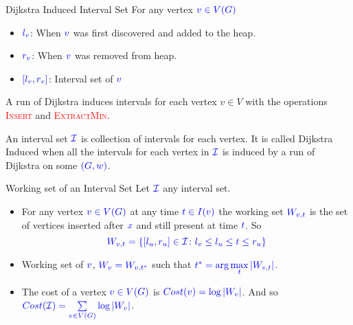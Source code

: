 \documentclass[10pt]{beamer}
\begin{document}
\begin{frame}{Dijkstra Induced Interval Set}
	For any vertex $\mathcolor{blue}{v\in V(G)}$\begin{itemize}
		\item $\mathcolor{blue}{l_v}$: When $\mathcolor{blue}{v}$ was first discovered and added to the heap.
		\item $\mathcolor{blue}{r_v}$: When $\mathcolor{blue}{v}$ was removed from heap.
		\item $\mathcolor{blue}{[l_v,r_v]}$: Interval set of $\mathcolor{blue}{v}$
	\end{itemize} \pause \vfill

	A run of Dijkstra induces intervals for each vertex $v\in V$ with the operations \textcolor{red}{\textsc{Insert}} and \textcolor{red}{\textsc{ExtractMin}}.\pause  \vfill

	An interval set $\mathcolor{blue}{\mathcal{I}}$ is collection of intervals for each vertex. It is called Dijkstra Induced when all the intervals for each vertex in $\mathcolor{blue}{\mathcal{I}}$ is induced by a run of Dijkstra on some $\mathcolor{blue}{(G,w)}$.
\end{frame}
\begin{frame}{Working set of an Interval Set}
	Let $\mathcolor{blue}{\mathcal{I}}$ any interval set.\pause

	\begin{itemize}
		\item For any vertex $\mathcolor{blue}{v\in V(G)}$ at any time $\mathcolor{blue}{t\in I(v)}$ the working set $\mathcolor{blue}{W_{v,t}}$ is the set of vertices inserted after $\mathcolor{blue}{x}$ and still present at time $\mathcolor{blue}{t}$. So $$\mathcolor{blue}{W_{v,t}=\{[l_u,r_u]\in\mathcal{I}\colon l_v\leq l_u\leq t\leq r_u\}}$$\pause \vfill
		\item Working set of $\mathcolor{blue}{v}$, $\mathcolor{blue}{W_v=W_{v,t^*}}$ such that $\mathcolor{blue}{t^*=\arg\max\limits_t|W_{v,t}|}$.\pause  \vfill
		\item The cost of a vertex $\mathcolor{blue}{v\in V(G)}$ is $\mathcolor{blue}{Cost(v)=\log|W_v|}$. And so $\mathcolor{blue}{Cost(\mathcal{I})=\sum\limits_{v\in V(G)} \log |W_v|}$.
	\end{itemize}
\end{frame}
\end{document}

